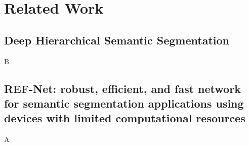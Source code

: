 \section{Related Work}

  \subsection{Deep Hierarchical Semantic Segmentation\cite{li2022deep}}

  B

  \subsection{REF-Net: robust, efficient, and fast network for semantic
  segmentation applications using devices with limited computational resources\cite{olimov2021ref}}

  A
